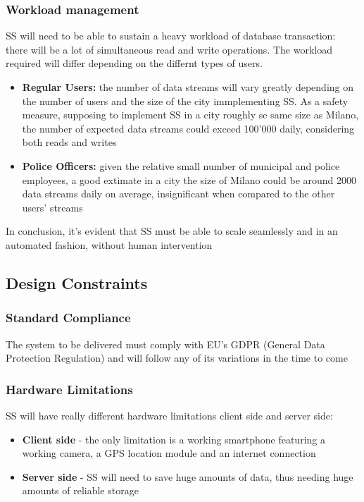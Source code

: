\subsubsection{Workload management}
SS will need to be able to sustain a heavy workload of database transaction: there will be a lot of simultaneous read and write operations. The workload required will differ depending on the differnt types of users.
\begin{itemize}
	\item \textbf{Regular Users:} the number of data streams will vary greatly depending on the number of users and the size of the city immplementing SS. As a safety measure, supposing to implement SS in a city roughly se same size as Milano, the number of expected data streams could exceed 100'000 daily, considering both reads and writes
	\item \textbf{Police Officers: } given the relative small number of municipal and police employees, a good extimate in a city the size of Milano could be around 2000 data streams daily on average, insignificant when compared to the other users' streams  
\end{itemize}
In conclusion, it's evident that SS must be able to scale seamlessly and in an automated fashion, without human intervention


\subsection{Design Constraints}
	\subsubsection{Standard Compliance}
	The system to be delivered must comply with EU's GDPR (General Data Protection Regulation) and will follow any of its variations in the time to come
	\subsubsection{Hardware Limitations}
	SS will have really different hardware limitations client side and server side:
	\begin{itemize}
		\item \textbf{Client side} - the only limitation is a working smartphone featuring a working camera, a GPS location module and an internet connection 
		\item \textbf{Server side} - SS will need to save huge amounts of data, thus needing huge amounts of reliable storage
	\end{itemize}
	 
